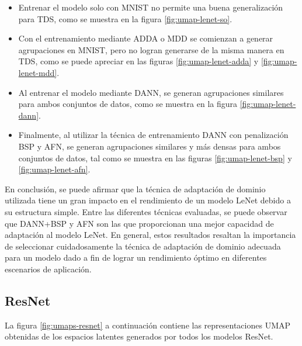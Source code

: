\begin{itemize}
    \item Entrenar el modelo solo con MNIST no permite una buena generalización para TDS, como se muestra en la figura
          \ref{fig:umap-lenet-so}.
    \item Con el entrenamiento mediante ADDA o MDD se comienzan a generar agrupaciones en MNIST, pero no logran generarse de la
          misma manera en TDS, como se puede apreciar en las figuras \ref{fig:umap-lenet-adda} y \ref{fig:umap-lenet-mdd}.
    \item Al entrenar el modelo mediante DANN, se generan agrupaciones similares para ambos conjuntos de datos, como se muestra
          en la figura \ref{fig:umap-lenet-dann}.
    \item Finalmente, al utilizar la técnica de entrenamiento DANN con penalización BSP y AFN, se generan agrupaciones similares
          y más densas para ambos conjuntos de datos, tal como se muestra en las figuras \ref{fig:umap-lenet-bsp} y
          \ref{fig:umap-lenet-afn}.
\end{itemize}

En conclusión, se puede afirmar que la técnica de adaptación de dominio utilizada tiene un gran impacto en el
rendimiento de un modelo LeNet debido a su estructura simple. Entre las diferentes técnicas evaluadas, se puede
observar que DANN+BSP y AFN son las que proporcionan una mejor capacidad de adaptación al modelo LeNet. En general,
estos resultados resaltan la importancia de seleccionar cuidadosamente la técnica de adaptación de dominio adecuada
para un modelo dado a fin de lograr un rendimiento óptimo en diferentes escenarios de aplicación.

\newpage
\subsection{ResNet}

La figura \ref{fig:umaps-resnet} a continuación contiene las representaciones UMAP obtenidas de los espacios latentes
generados por todos los modelos ResNet.

